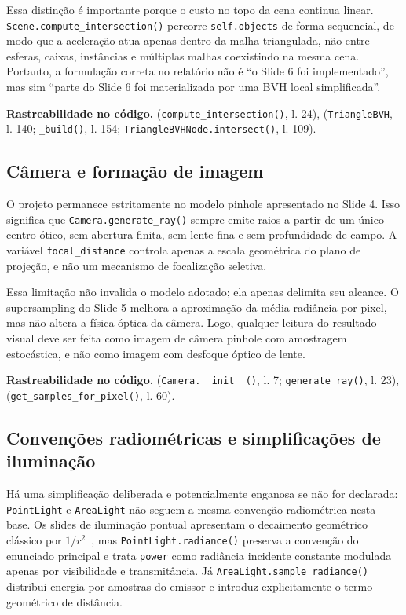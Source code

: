\documentclass[portuguese]{sbcreviews-2025}%
\newcommand{\slidescite}[2]{\citep[pp.~#2]{#1}}
\begin{document}
Essa distinção é importante porque o custo no topo da cena continua linear. \texttt{Scene.compute\_intersection()} percorre \texttt{self.objects} de forma sequencial, de modo que a aceleração atua apenas dentro da malha triangulada, não entre esferas, caixas, instâncias e múltiplas malhas coexistindo na mesma cena. Portanto, a formulação correta no relatório não é ``o Slide 6 foi implementado'', mas sim ``parte do Slide 6 foi materializada por uma BVH local simplificada''.

\noindent\textbf{Rastreabilidade no código.}  (\texttt{compute\_intersection()}, l. 24),  (\texttt{TriangleBVH}, l. 140; \texttt{\_build()}, l. 154; \texttt{TriangleBVHNode.intersect()}, l. 109).

\subsection{Câmera e formação de imagem}
\label{sec:limitacoes-camera}

O projeto permanece estritamente no modelo pinhole apresentado no Slide 4. Isso significa que \texttt{Camera.generate\_ray()} sempre emite raios a partir de um único centro ótico, sem abertura finita, sem lente fina e sem profundidade de campo. A variável \texttt{focal\_distance} controla apenas a escala geométrica do plano de projeção, e não um mecanismo de focalização seletiva.

Essa limitação não invalida o modelo adotado; ela apenas delimita seu alcance. O supersampling do Slide 5 melhora a aproximação da média radiância por pixel, mas não altera a física óptica da câmera. Logo, qualquer leitura do resultado visual deve ser feita como imagem de câmera pinhole com amostragem estocástica, e não como imagem com desfoque óptico de lente.

\noindent\textbf{Rastreabilidade no código.}  (\texttt{Camera.\_\_init\_\_()}, l. 7; \texttt{generate\_ray()}, l. 23),  (\texttt{get\_samples\_for\_pixel()}, l. 60).

\subsection{Convenções radiométricas e simplificações de iluminação}
\label{sec:limitacoes-radiometria}

Há uma simplificação deliberada e potencialmente enganosa se não for declarada: \texttt{PointLight} e \texttt{AreaLight} não seguem a mesma convenção radiométrica nesta base. Os slides de iluminação pontual apresentam o decaimento geométrico clássico por $1/r^2$~\slidescite{inf2608slides04}{40--41}, mas \texttt{PointLight.radiance()} preserva a convenção do enunciado principal e trata \texttt{power} como radiância incidente constante modulada apenas por visibilidade e transmitância. Já \texttt{AreaLight.sample\_radiance()} distribui energia por amostras do emissor e introduz explicitamente o termo geométrico de distância.
\end{document}
